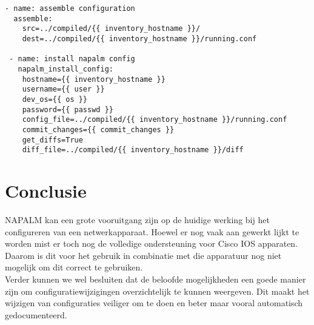 \begin{center}
\begin{Verbatim}
- name: assemble configuration
  assemble:
    src=../compiled/{{ inventory_hostname }}/
    dest=../compiled/{{ inventory_hostname }}/running.conf

 - name: install napalm config
   napalm_install_config:
    hostname={{ inventory_hostname }}
    username={{ user }}
    dev_os={{ os }}
    password={{ passwd }}
    config_file=../compiled/{{ inventory_hostname }}/running.conf
    commit_changes={{ commit_changes }}
    get_diffs=True
    diff_file=../compiled/{{ inventory_hostname }}/diff
\end{Verbatim}
\end{center}


\section{Conclusie}
\label{ch:napalconclusie}
NAPALM kan een grote vooruitgang zijn op de huidige werking bij het configureren van een netwerkapparaat. Hoewel er nog vaak aan gewerkt lijkt te worden mist er toch nog de volledige ondersteuning voor Cisco IOS apparaten. Daarom is dit voor het gebruik in combinatie met die apparatuur nog niet mogelijk om dit correct te gebruiken.
\\

Verder kunnen we wel besluiten dat de beloofde mogelijkheden een goede manier zijn om configuratiewijzigingen overzichtelijk te kunnen weergeven. Dit maakt het wijzigen van configuraties veiliger om te doen en beter maar vooral automatisch gedocumenteerd.